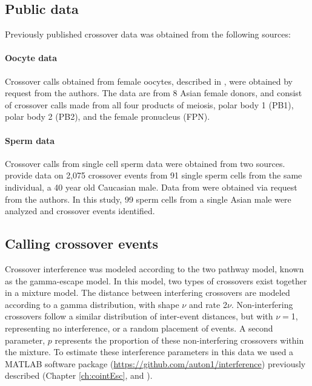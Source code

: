 \subsection{Public data}
Previously published crossover data was obtained from the following sources:

\paragraph{Oocyte data}
Crossover calls obtained from female oocytes, described in \citet{Hou2013}, were obtained by request from the authors.
The data are from 8 Asian female donors, and consist of crossover calls made from all four products of meiosis, polar body 1 (PB1), polar body 2 (PB2), and the female pronucleus (FPN).

\paragraph{Sperm data}
Crossover calls from single cell sperm data were obtained from two sources.
%
\citet{Wang2012} provide data on 2,075 crossover events from 91 single sperm cells from the same individual, a 40 year old Caucasian male.
%
Data from \citet{Lu2012} were obtained via request from the authors.
In this study, 99 sperm cells from a single Asian male were analyzed and crossover events identified.

\subsection{Calling crossover events}
Crossover interference was modeled according to the two pathway model, known as the gamma-escape model.
In this model, two types of crossovers exist together in a mixture model.
The distance between interfering crossovers are modeled according to a gamma distribution, with shape $\nu$ and rate 2$\nu$.
Non-interfering crossovers follow a similar distribution of inter-event distances, but with $\nu=$1, representing no interference, or a random placement of events.
A second parameter, $p$ represents the proportion of these non-interfering crossovers within the mixture.
To estimate these interference parameters in this data we used a MATLAB software package (\url{https://github.com/auton1/interference}) previously described (Chapter \ref{ch:cointEsc}, and \citet{Campbell2015}).


